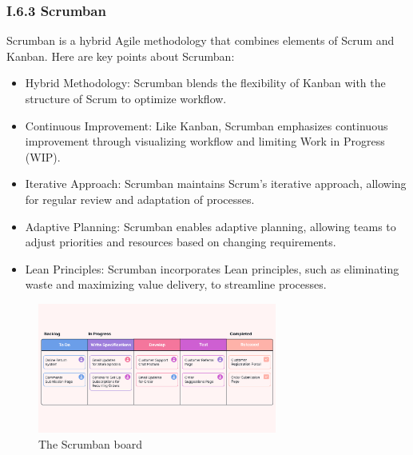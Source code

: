 \subsubsection*{I.6.3 Scrumban}

Scrumban is a hybrid Agile methodology that combines elements of Scrum and Kanban. Here are key points about Scrumban:

\begin{itemize}
    \item Hybrid Methodology: Scrumban blends the flexibility of Kanban with the structure of Scrum to optimize workflow.
    \item Continuous Improvement: Like Kanban, Scrumban emphasizes continuous improvement through visualizing workflow and limiting Work in Progress (WIP).
    \item Iterative Approach: Scrumban maintains Scrum's iterative approach, allowing for regular review and adaptation of processes.
    \item Adaptive Planning: Scrumban enables adaptive planning, allowing teams to adjust priorities and resources based on changing requirements.
    \item Lean Principles: Scrumban incorporates Lean principles, such as eliminating waste and maximizing value delivery, to streamline processes.
\end{itemize}


\begin{figure}[H]
    \centering
    \includegraphics[width=0.7\textwidth]{src/assets/chapters/Scrumban.png}
    \caption{The Scrumban board}
    \label{fig:Scrumban_image}
\end{figure}


